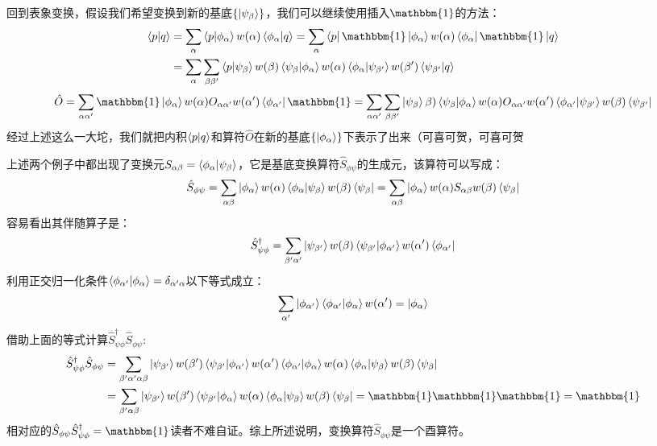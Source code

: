 回到表象变换，假设我们希望变换到新的基底$\{\ket{\psi_{\beta}}\}$，我们可以继续使用插入$\mathbbm{1}$的方法：
\[\begin{aligned}
\bra{p}\ket{q}&=\sum_{\alpha}\bra{p}\ket{\phi_{\alpha}}w(\alpha)\bra{\phi_{\alpha}}\ket{q}=\sum_{\alpha}\bra{p}\mathbbm{1}\ket{\phi_{\alpha}}w(\alpha)\bra{\phi_{\alpha}}\mathbbm{1}\ket{q}\\
&=\sum_{\alpha}\sum_{\beta\beta'}\bra{p}\ket{\psi_{\beta}}w(\beta)\bra{\psi_{\beta}}\ket{\phi_{\alpha}}w(\alpha)\bra{\phi_{\alpha}}\ket{\psi_{\beta'}}w(\beta')\bra{\psi_{\beta'}}\ket{q}
\end{aligned}\]
\[\hat{O}=\sum_{\alpha\alpha'}\mathbbm{1}\ket{\phi_{\alpha}}w(\alpha)O_{\alpha\alpha'}w(\alpha')\bra{\phi_{\alpha'}}\mathbbm{1}=\sum_{\alpha\alpha'}\sum_{\beta\beta'}\ket{\psi_{\beta}}\beta)\bra{\psi_{\beta}}\ket{\phi_{\alpha}}w(\alpha)O_{\alpha\alpha'}w(\alpha')\bra{\phi_{\alpha'}}\ket{\psi_{\beta'}}w(\beta)\bra{\psi_{\beta'}}\]
经过上述这么一大坨，我们就把内积$\bra{p}\ket{q}$和算符$\hat{O}$在新的基底$\{\ket{\phi_{\alpha}}\}$下表示了出来（可喜可贺，可喜可贺

上述两个例子中都出现了变换元$S_{\alpha\beta}=\bra{\phi_{\alpha}}\ket{\psi_{\beta}}$，它是基底变换算符$\hat{S}_{\phi\psi}$的生成元，该算符可以写成：
\[\hat{S}_{\phi\psi}=\sum_{\alpha\beta}\ket{\phi_{\alpha}}w(\alpha)\bra{\phi_{\alpha}}\ket{\psi_{\beta}}w(\beta)\bra{\psi_{\beta}}=\sum_{\alpha\beta}\ket{\phi_{\alpha}}w(\alpha)S_{\alpha\beta}w(\beta)\bra{\psi_{\beta}}\]
容易看出其伴随算子是：
\[\hat{S}_{\psi\phi}^{\dagger}=\sum_{\beta'\alpha'}\ket{\psi_{\beta'}}w(\beta)\bra{\psi_{\beta'}}\ket{\phi_{\alpha'}}w(\alpha')\bra{\phi_{\alpha'}}\]
利用正交归一化条件$\bra{\phi_{\alpha'}}\ket{\phi_{\alpha}}=\delta_{\alpha'\alpha}$以下等式成立：
\[\sum_{\alpha'}\ket{\phi_{\alpha'}}\bra{\phi_{\alpha'}}\ket{\phi_{\alpha}}w(\alpha')=\ket{\phi_{\alpha}}\]
借助上面的等式计算$\hat{S}_{\psi\phi}^{\dagger}\hat{S}_{\phi\psi}$:
\[\begin{aligned}
\hat{S}_{\psi\phi}^{\dagger}\hat{S}_{\phi\psi}&=\sum_{\beta'\alpha'\alpha\beta}\ket{\psi_{\beta'}}w(\beta')\bra{\psi_{\beta'}}\ket{\phi_{\alpha'}}w(\alpha')\bra{\phi_{\alpha'}}\ket{\phi_{\alpha}}w(\alpha)\bra{\phi_{\alpha}}\ket{\psi_{\beta}}w(\beta)\bra{\psi_{\beta}}\\&=\sum_{\beta'\alpha\beta}\ket{\psi_{\beta'}}w(\beta')\bra{\psi_{\beta'}}\ket{\phi_{\alpha}}w(\alpha)\bra{\phi_{\alpha}}\ket{\psi_{\beta}}w(\beta)\bra{\psi_{\beta}}=\mathbbm{1}\mathbbm{1}\mathbbm{1}=\mathbbm{1}
\end{aligned}\]
相对应的$\hat{S}_{\phi\psi}\hat{S}_{\psi\phi}^{\dagger}=\mathbbm{1}$读者不难自证。综上所述说明，变换算符$\hat{S}_{\phi\psi}$是一个酉算符。

